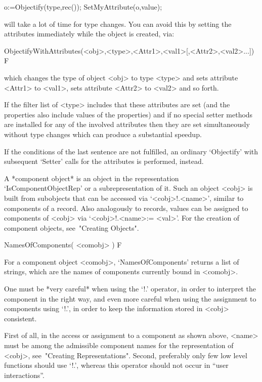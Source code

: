 \begintt
o:=Objectify(type,rec());
SetMyAttribute(o,value);
\endtt

will take a lot of time for type changes. You can avoid this  by  setting
the attributes immediately while the object is created, via:

\>ObjectifyWithAttributes(<obj>,<type>,<Attr1>,<val1>[,<Attr2>,<val2>...]) F

which changes the type of object <obj> to type <type> and sets  attribute
<Attr1> to <val1>, sets attribute <Attr2> to <val2> and so forth.

If the filter list of <type> includes that these attributes are set  (and
the properties also include values of the properties) and if  no  special
setter methods are installed for any of the involved attributes then they
are  set  simultaneously  without  type  changes  which  can  produce   a
substantial speedup.

If the conditions of the last sentence are  not  fulfilled,  an  ordinary
`Objectify'  with  subsequent  `Setter'  calls  for  the  attributes   is
performed, instead.


A *component object* is an object in the representation
`IsComponentObjectRep' or a subrepresentation of it.
Such an object <cobj> is built from subobjects that can be accessed via
`<cobj>!.<name>', similar to components of a record.
Also analogously to records, values can be assigned to components of
<cobj> via `<cobj>!.<name>:= <val>'.
For the creation of component objects, see~"Creating Objects".

\>NamesOfComponents( <comobj> ) F

For a component object <comobj>, `NamesOfComponents' returns a list of
strings, which are the names of components currently bound in <comobj>.

One must be *very careful* when using the `!.' operator,
in order to interpret the component in the right way,
and even more careful when using the assignment to components using `!.',
in order to keep the information stored in <cobj> consistent.

First of all, in the access or assignment to a component as shown above,
<name> must be among the admissible component names
for the representation of <cobj>, see~"Creating Representations".
Second, preferably only few low level functions should use `!.',
whereas this operator should not occur in ``user interactions''.

